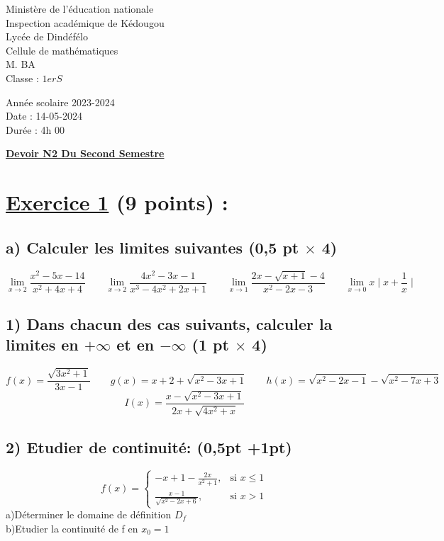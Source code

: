 \documentclass{article}
\begin{document}
\begin{minipage}{0.7\textwidth}
	Ministère de l'éducation nationale  \\
	Inspection académique de Kédougou   \\
	Lycée de Dindéfélo            \\
	Cellule de mathématiques            \\
	M. BA                          \\
	Classe : $1erS$  \\
\end{minipage}
\begin{minipage}{0.5\textwidth}
	Année scolaire 2023-2024 \\
	Date : 14-05-2024 \\
	Durée : 4h 00 \\
\end{minipage}

\begin{center}
	\textbf{{\underline{Devoir N2 Du Second Semestre}}}
\end{center}

\section*{\underline{Exercice 1} (9 points) :}
\subsection*{a) Calculer les limites suivantes (0,5 pt $\times$ 4)}
\[ \lim_{x \to 2}\frac{x^{2}-5x-14}{x^{2}+4x+4}\quad\quad 
\lim_{x \to 2}\frac{4x^{2}-3x-1}{x^{3}-4x^{2}+2x+1}\quad\quad 
\lim_{x \to 1}\frac{2x-\sqrt{x+1}-4}{x^{2}-2x-3}\quad\quad 
\lim_{x \to 0}x\mid x+\frac{1}{x}\mid\]
\subsection*{1) Dans chacun des cas suivants, calculer la limites en $+\infty$ et en $-\infty$ (1 pt $\times$ 4)}
\[ f(x)=\frac{\sqrt{3x^{2}+1}}{3x-1}\quad\quad 
g(x)=x+2+\sqrt{x^{2}-3x+1}\quad\quad 
h(x)=\sqrt{x^{2}-2x-1}-\sqrt{x^{2}-7x+3} \]
\[I(x)=\frac{x-\sqrt{x^{2}-3x+1}}{2x+\sqrt{4x^{2}+x}} \]
\subsection*{2) Etudier de continuité: (0,5pt +1pt)}
\[ f(x) = \begin{cases} 
  -x+1-\frac{2x}{x^{2}+1}, & \text{si } x \leq 1 \\
  \frac{x-1}{\sqrt{x^{2}-2x+6}}, & \text{si } x > 1
\end{cases} \]
a)Déterminer le domaine de définition $D_{f}$\\
b)Etudier la continuité de f en $x_{0}=1$
\end{document}
